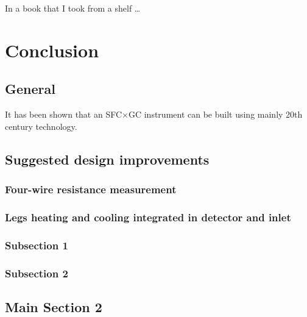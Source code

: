 
\begin{savequote}[45mm]
In a book that I took from a shelf \ldots
{}
\end{savequote}

\chapter{Conclusion} %

\label{Chapter8} %


\section{General}

It has been shown that an SFC×GC instrument can be built using mainly 20th century technology. 

\section{Suggested design improvements}

\subsection{Four-wire resistance measurement}
\subsection{Legs heating and cooling integrated in detector and inlet}
\subsection{}

\subsection{Subsection 1}


\subsection{Subsection 2}


\section{Main Section 2}
